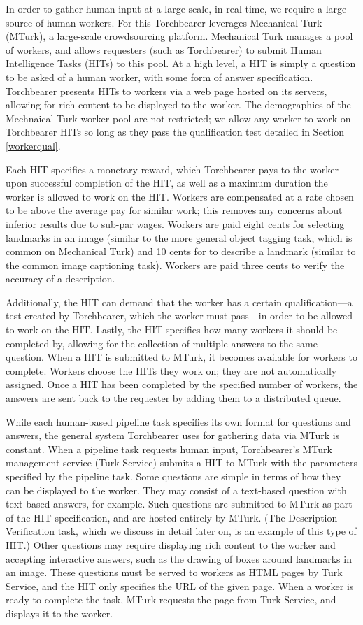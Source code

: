 In order to gather human input at a large scale, in real time, we require a large source of human workers. For this Torchbearer leverages Mechanical Turk (MTurk), a large-scale crowdsourcing platform. Mechanical Turk manages a pool of workers, and allows requesters (such as Torchbearer) to submit Human Intelligence Tasks (HITs) to this pool. At a high level, a HIT is simply a question to be asked of a human worker, with some form of answer specification. Torchbearer presents HITs to workers via a web page hosted on its servers, allowing for rich content to be displayed to the worker. The demographics of the Mechnaical Turk worker pool are not restricted; we allow any worker to work on Torchbearer HITs so long as they pass the qualification test detailed in Section \ref{workerqual}.

Each HIT specifies a monetary reward, which Torchbearer pays to the worker upon successful completion of the HIT, as well as a maximum duration the worker is allowed to work on the HIT. Workers are compensated at a rate chosen to be above the average pay for similar work; this removes any concerns about inferior results due to sub-par wages. Workers are paid eight cents for selecting landmarks in an image (similar to the more general object tagging task, which is common on Mechanical Turk) and 10 cents for to describe a landmark (similar to the common image captioning task). Workers are paid three cents to verify the accuracy of a description.

Additionally, the HIT can demand that the worker has a certain qualification---a test created by Torchbearer, which the worker must pass---in order to be allowed to work on the HIT.  Lastly, the HIT specifies how many workers it should be completed by, allowing for the collection of multiple answers to the same question. When a HIT is submitted to MTurk, it becomes available for workers to complete. Workers choose the HITs they work on; they are not automatically assigned. Once a HIT has been completed by the specified number of workers, the answers are sent back to the requester by adding them to a distributed queue.

While each human-based pipeline task specifies its own format for questions and answers, the general system Torchbearer uses for gathering data via MTurk is constant. When a pipeline task requests human input, Torchbearer's MTurk management service (Turk Service) submits a HIT to MTurk with the parameters specified by the pipeline task. Some questions are simple in terms of how they can be displayed to the worker. They may consist of a text-based question with text-based answers, for example. Such questions are submitted to MTurk as part of the HIT specification, and are hosted entirely by MTurk. (The Description Verification task, which we discuss in detail later on, is an example of this type of HIT.) Other questions may require displaying rich content to the worker and accepting interactive answers, such as the drawing of boxes around landmarks in an image. These questions must be served to workers as HTML pages by Turk Service, and the HIT only specifies the URL of the given page. When a worker is ready to complete the task, MTurk requests the page from Turk Service, and displays it to the worker.


